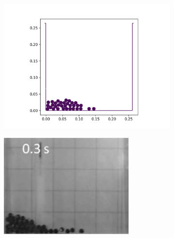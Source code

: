 \begin{figure}[!htpb]
  \begin{subfigure}{0.48\textwidth}
    \centering
    \includegraphics[width=1.0\textwidth]{figures/rfc/figures/stack_of_cylinders_2d/Mohseni_Vyas/time2}
  \end{subfigure}
  \begin{subfigure}{0.48\textwidth}
    \centering
    \includegraphics[width=0.75\textwidth]{images/rfc/images/stack_of_cylinders_experimental_images/time2}
  \end{subfigure}


\end{figure}
